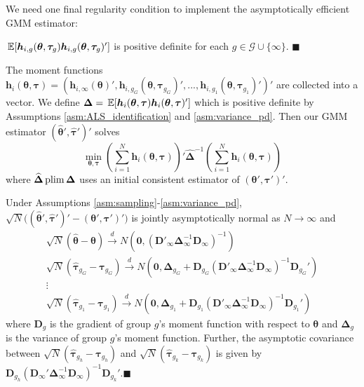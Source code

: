 \documentclass[12pt]{article}
\begin{document}
We need one final regularity condition to implement the asymptotically efficient GMM estimator:
\begin{assumption}\label{asm:variance_pd}
  $\expec{\bm h_{i, g}(\bm{\theta}, \bm \tau_g) \bm h_{i, g}(\bm{\theta}, \bm \tau_g)'}$ is positive definite for each $g \in \mathcal{G} \cup \{\infty\}$. $\blacksquare$
\end{assumption}

The moment functions $\bm h_i(\bm{\theta}, \bm \tau) = (\bm h_{i, \infty}(\bm{\theta})', \bm h_{i, g_G}(\bm{\theta}, \bm \tau_{g_G})',...,\bm h_{i, g_1}(\bm{\theta}, \bm \tau_{g_1})')'$ are collected into a vector. We define $\bm \Delta = \expec{\bm h_i(\bm{\theta}, \bm \tau) \bm h_i(\bm{\theta}, \bm \tau)'}$ which is positive definite by Assumptions \ref{asm:ALS_identification} and \ref{asm:variance_pd}. Then our GMM estimator $(\widehat{ \bm{\theta}}', \widehat{ \bm \tau}')'$ solves
\begin{equation}\label{eq:minimization_problem}
  \min_{\bm{\theta}, \bm \tau} \left( \sum_{i = 1}^N \bm h_i(\bm{\theta}, \bm \tau) \right)' \widehat{\bm \Delta}^{-1} \left( \sum_{i = 1}^N \bm h_i(\bm{\theta}, \bm \tau) \right)
\end{equation}
where $\widehat{\bm \Delta} \operatorname{plim} \bm \Delta$ uses an initial consistent estimator of $(\bm{\theta}', \bm \tau')'$. 

\begin{theorem}\label{theorem:asymptotic_distribution}
  Under Assumptions \ref{asm:sampling}-\ref{asm:variance_pd}, $\sqrt{N}\big((\widehat{\bm{\theta}}', \widehat{\bm \tau}')' - (\bm{\theta}', \bm \tau')'\big)$ is jointly asymptotically normal as $N \rightarrow \infty$ and
  \begin{gather*}
    \sqrt{N}(\widehat{\bm{\theta}} - \bm{\theta}) \stackrel{d}{\rightarrow} N \left( \bm 0, \left( \bm D'_{\infty} \bm \Delta_{\infty}^{-1} \bm D_{\infty} \right)^{-1} \right) \\
    \sqrt{N}(\widehat{\bm \tau}_{g_G} - \bm \tau_{g_G}) \stackrel{d}{\rightarrow} N \left( \bm 0, \bm \Delta_{g_G} + \bm D_{g_G} \left( \bm D'_{\infty} \bm \Delta_{\infty}^{-1} \bm D_{\infty} \right)^{-1} \bm D_{g_G}'  \right)\\
    \vdots\\
    \sqrt{N}(\widehat{\bm \tau}_{g_1} - \bm \tau_{g_1}) \stackrel{d}{\rightarrow} N \left( \bm 0, \bm \Delta_{g_1} + \bm D_{g_1} \left( \bm D'_{\infty} \bm \Delta_{\infty}^{-1} \bm D_{\infty} \right)^{-1} \bm D_{g_1}' \right)
  \end{gather*}
where $\bm D_g$ is the gradient of group $g$'s moment function with respect to $\bm{\theta}$ and $\bm \Delta_g$ is the variance of group $g$'s moment function. Further, the asymptotic covariance between $\sqrt{N}(\widehat{\bm \tau}_{g_h} - \bm \tau_{g_h})$ and $\sqrt{N}(\widehat{\bm \tau}_{g_k} - \bm \tau_{g_k})$ is given by $\bm D_{g_h} (\bm D_{\infty}' \bm \Delta_{\infty}^{-1} \bm D_{\infty})^{-1} \bm D_{g_k}'$.$\blacksquare$
\end{theorem}
\end{document}
